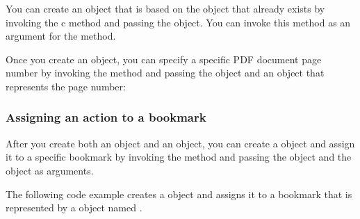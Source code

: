 \documentclass[letterpaper,12pt,english,openany,oneside]{sphinxmanual}
\begin{document}
You can create an  object that is based on the  object that already exists by invoking the  c method and passing the  object. You can invoke this method as an argument for the  method.

\begin{sphinxVerbatim}[commandchars=\\\{\}]
   
\end{sphinxVerbatim}

Once you create an  object, you can specify a specific PDF document page number by invoking the  method and passing the  object and an  object that represents the page number:

\begin{sphinxVerbatim}[commandchars=\\\{\}]
   
\end{sphinxVerbatim}


\subsubsection{Assigning an action to a bookmark}
\label{\detokenize{Plugins_Bookmark:assigning-an-action-to-a-bookmark}}
After you create both an  object and an  object, you can create a  object and assign it to a specific bookmark by invoking the  method and passing the  object and the  object as arguments.

The following code example creates a  object and assigns it to a bookmark that is represented by a  object named .
\end{document}
